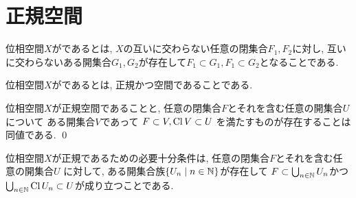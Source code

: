 \documentclass[uplatex, dvipdfmx, a4paper, 12pt, class=jsbook, crop=false]{standalone}
\begin{document}
\section{正規空間}
\label{sec:normal-spaces}

\begin{definition}
	位相空間$ X $がであるとは, $ X $の互いに交わらない任意の閉集合$ F_1, F_2 $に対し, 互いに交わらないある開集合$ G_1, G_2 $が存在して$ F_1 \subset G_1, F_1 \subset G_2 $となることである.
\end{definition}

\begin{definition}
	位相空間$ X $がであるとは,
	正規かつ空間であることである.
\end{definition}

\begin{proposition}
	\label{t400002}
	位相空間\( X \)が正規空間であることと,
	任意の閉集合\( F \)とそれを含む任意の開集合\( U \)について
	ある開集合\( V \)であって
	\( F \subset V, \mathop{\mathrm{Cl}}\nolimits V \subset U \)
	を満たすものが存在することは同値である.
	\qed
\end{proposition}

\begin{theorem}
	\label{t400001}
	位相空間\( X \)が正規であるための必要十分条件は,
	任意の閉集合\( F \)とそれを含む任意の開集合\( U \)
	に対して, ある開集合族\( \setcomp{U_n}{n \in \N} \)が存在して
	\( F \subset \bigcup_{n \in \mathbb{N}} U_n \)かつ
	\( \bigcup_{n \in \mathbb{N}} \mathop{\mathrm{Cl}}\nolimits U_n \subset U \)が成り立つことである.
\end{theorem}
\end{document}
